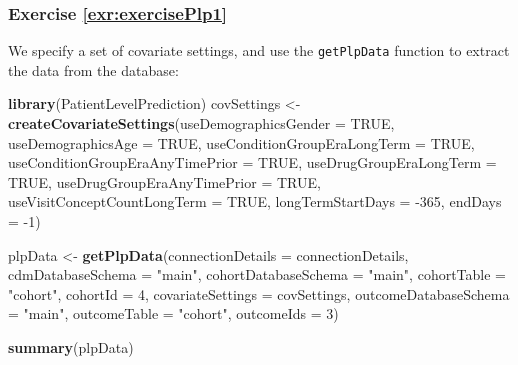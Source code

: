 \documentclass[11pt]{book}
\newenvironment{Shaded}{\begin{snugshade}}{\end{snugshade}}
\newcommand{\DataTypeTok}[1]{\textcolor[rgb]{0.13,0.29,0.53}{#1}}
\newcommand{\DecValTok}[1]{\textcolor[rgb]{0.00,0.00,0.81}{#1}}
\newcommand{\KeywordTok}[1]{\textcolor[rgb]{0.13,0.29,0.53}{\textbf{#1}}}
\newcommand{\NormalTok}[1]{#1}
\newcommand{\OtherTok}[1]{\textcolor[rgb]{0.56,0.35,0.01}{#1}}
\newcommand{\StringTok}[1]{\textcolor[rgb]{0.31,0.60,0.02}{#1}}
\theoremstyle{definition}
\theoremstyle{definition}
\theoremstyle{definition}
\theoremstyle{remark}
\begin{document}
\hypertarget{exercise-refexrexerciseplp1}{%
\subsubsection*{Exercise \ref{exr:exercisePlp1}}\label{exercise-refexrexerciseplp1}}

We specify a set of covariate settings, and use the \texttt{getPlpData} function to extract the data from the database:

\begin{Shaded}
\begin{Highlighting}[]
\KeywordTok{library}\NormalTok{(PatientLevelPrediction)}
\NormalTok{covSettings <-}\StringTok{ }\KeywordTok{createCovariateSettings}\NormalTok{(}\DataTypeTok{useDemographicsGender =} \OtherTok{TRUE}\NormalTok{,}
                                       \DataTypeTok{useDemographicsAge =} \OtherTok{TRUE}\NormalTok{,}
                                       \DataTypeTok{useConditionGroupEraLongTerm =} \OtherTok{TRUE}\NormalTok{,}
                                       \DataTypeTok{useConditionGroupEraAnyTimePrior =} \OtherTok{TRUE}\NormalTok{,}
                                       \DataTypeTok{useDrugGroupEraLongTerm =} \OtherTok{TRUE}\NormalTok{,}
                                       \DataTypeTok{useDrugGroupEraAnyTimePrior =} \OtherTok{TRUE}\NormalTok{,}
                                       \DataTypeTok{useVisitConceptCountLongTerm =} \OtherTok{TRUE}\NormalTok{,}
                                       \DataTypeTok{longTermStartDays =} \DecValTok{-365}\NormalTok{,}
                                       \DataTypeTok{endDays =} \DecValTok{-1}\NormalTok{)}

\NormalTok{plpData <-}\StringTok{ }\KeywordTok{getPlpData}\NormalTok{(}\DataTypeTok{connectionDetails =}\NormalTok{ connectionDetails,}
                      \DataTypeTok{cdmDatabaseSchema =} \StringTok{"main"}\NormalTok{,}
                      \DataTypeTok{cohortDatabaseSchema =} \StringTok{"main"}\NormalTok{,}
                      \DataTypeTok{cohortTable =} \StringTok{"cohort"}\NormalTok{,}
                      \DataTypeTok{cohortId =} \DecValTok{4}\NormalTok{,}
                      \DataTypeTok{covariateSettings =}\NormalTok{ covSettings,}
                      \DataTypeTok{outcomeDatabaseSchema =} \StringTok{"main"}\NormalTok{,}
                      \DataTypeTok{outcomeTable =} \StringTok{"cohort"}\NormalTok{,}
                      \DataTypeTok{outcomeIds =} \DecValTok{3}\NormalTok{)}

\KeywordTok{summary}\NormalTok{(plpData)}
\end{Highlighting}
\end{Shaded}
\end{document}
